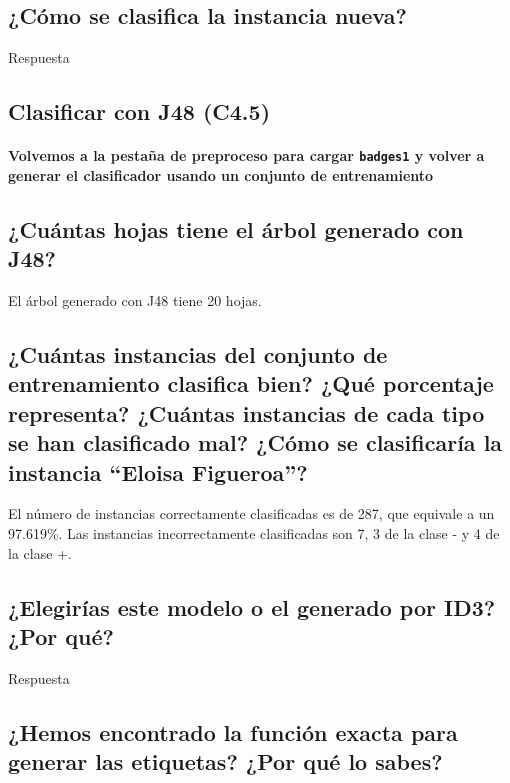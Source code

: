 \documentclass[12pt]{article}
\begin{document}
\subsection*{\small ¿Cómo se clasifica la instancia nueva?}

Respuesta

\newpage

\begin{center}
\section{Clasificar con J48 (C4.5)}
\end{center}

\paragraph{\small Volvemos a la pestaña de preproceso para cargar
\texttt{badges1} y volver a generar el clasificador usando un conjunto de
entrenamiento}

\subsection*{\small ¿Cuántas hojas tiene el árbol generado con J48?}

El árbol generado con J48 tiene 20 hojas.

\subsection*{\small ¿Cuántas instancias del conjunto de entrenamiento clasifica
bien? ¿Qué porcentaje representa? ¿Cuántas instancias de cada tipo se han
clasificado mal? ¿Cómo se clasificaría la instancia ``Eloisa Figueroa''?}

El número de instancias correctamente clasificadas es de 287, que equivale a un  97.619\%. Las instancias incorrectamente clasificadas son 7, 3 de la clase - y 4 de la clase +.


\subsection*{\small ¿Elegirías este modelo o el generado por ID3? ¿Por qué?}

Respuesta

\subsection*{\small ¿Hemos encontrado la función exacta para generar las
etiquetas? ¿Por qué lo sabes?}
\end{document}
